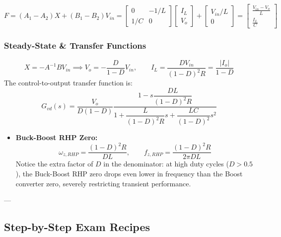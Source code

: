 \begin{itemize}
\begin{equation}
  \end{equation}
  \begin{equation}
  F = (A_1 - A_2) X + (B_1 - B_2) V_{in} = \begin{bmatrix} 0 & -1/L \\ 1/C & 0 \end{bmatrix} \begin{bmatrix} I_L \\ V_o \end{bmatrix} + \begin{bmatrix} V_{in}/L \\ 0 \end{bmatrix} = \begin{bmatrix} \frac{V_{in} - V_o}{L} \\ \frac{I_L}{C} \end{bmatrix}
  \end{equation}
\end{itemize}

\subsubsection{Steady-State \& Transfer Functions}
\begin{equation}
X = -A^{-1} B V_{in} \implies V_o = -\frac{D}{1-D} V_{in}, \qquad I_L = \frac{D V_{in}}{(1-D)^2 R} = \frac{|I_o|}{1-D}
\end{equation}
The control-to-output transfer function is:
\begin{equation}
\boxed{G_{vd}(s) = \frac{V_o}{D(1-D)} \frac{1 - s \dfrac{D L}{(1-D)^2 R}}{1 + \dfrac{L}{(1-D)^2 R} s + \dfrac{LC}{(1-D)^2} s^2}}
\end{equation}
\begin{itemize}
  \item \textbf{Buck-Boost RHP Zero:}
  \begin{equation}
  \boxed{\omega_{z,RHP} = \frac{(1-D)^2 R}{D L}, \qquad f_{z,RHP} = \frac{(1-D)^2 R}{2\pi D L}}
  \end{equation}
  Notice the extra factor of $D$ in the denominator: at high duty cycles ($D > 0.5$), the Buck-Boost RHP zero drops even lower in frequency than the Boost converter zero, severely restricting transient performance.
\end{itemize}

---

\subsection{Step-by-Step Exam Recipes}


